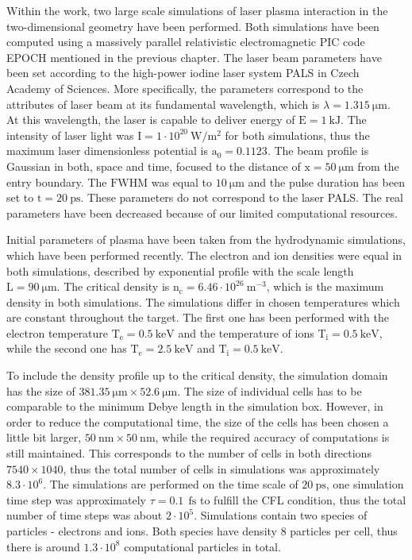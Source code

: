 Within the work, two large scale simulations of laser plasma interaction in the two-dimensional geometry have been performed. Both simulations have been computed using a massively parallel relativistic electromagnetic PIC code EPOCH mentioned in the previous chapter. The laser beam parameters have been set according to the high-power iodine laser system PALS in Czech Academy of Sciences. More specifically, the parameters correspond to the attributes of laser beam at its fundamental wavelength, which is $ \lambda = 1.315 \: \mathrm{\mu m} $. At this wavelength, the laser is capable to deliver energy of $ \mathrm{E} = 1 \: \mathrm{kJ} $. The intensity of laser light was $ \mathrm{I} = 1 \cdot 10^{20} \: \mathrm{W/m^{2}} $ for both simulations, thus the maximum laser dimensionless potential is $ \mathrm{a_0} = 0.1123 $. The beam profile is Gaussian in both, space and time, focused to the distance of $ \mathrm{x} = 50 \: \mathrm{\mu m} $ from the entry boundary. The $ \mathrm{FWHM} $ was equal to $ 10 \: \mathrm{\mu m} $ and the pulse duration has been set to $ \mathrm{t} = 20 \: \mathrm{ps} $. These parameters do not correspond to the laser PALS. The real parameters have been decreased because of our limited computational resources.

Initial parameters of plasma have been taken from the hydrodynamic simulations, which have been performed recently. The electron and ion densities were equal in both simulations, described by exponential profile with the scale length $ \mathrm{L} = 90 \: \mathrm{\mu m} $. The critical density is $ \mathrm{n_{c}} = 6.46 \cdot 10^{26} \: \mathrm{m^{-3}} $, which is the maximum density in both simulations. The simulations differ in chosen temperatures which are constant throughout the target. The first one has been performed with the electron temperature $ \mathrm{T_e} = 0.5 \: \mathrm{keV} $ and the temperature of ions $ \mathrm{T_i} = 0.5 \: \mathrm{keV} $, while the second one has $ \mathrm{T_e} = 2.5 \: \mathrm{keV} $ and $ \mathrm{T_i} = 0.5 \: \mathrm{keV} $.

To include the density profile up to the critical density, the simulation domain has the size of $ 381.35 \: \mathrm{\mu m} \times 52.6 \: \mathrm{\mu m} $. The size of individual cells has to be comparable to the minimum Debye length in the simulation box. However, in order to reduce the computational time, the size of the cells has been chosen a little bit larger, $ 50 \: \mathrm{nm} \times 50 \: \mathrm{nm} $, while the required accuracy of computations is still maintained. This corresponds to the number of cells in both directions $ 7540 \times 1040 $, thus the total number of cells in simulations was approximately $ 8.3 \cdot 10^{6} $. The simulations are performed on the time scale of $ 20 \: \mathrm{ps} $, one simulation time step was approximately $ \tau = 0.1 \:\: \mathrm{fs} $ to fulfill the CFL condition, thus the total number of time steps was about $ 2\cdot 10^{5} $. Simulations contain two species of particles - electrons and ions. Both species have density $ 8 $ particles per cell, thus there is around $ 1.3 \cdot 10^{8} $ computational particles in total.

